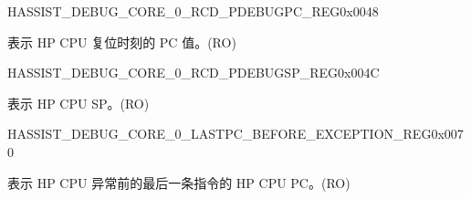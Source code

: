 \begin{register}{H}{ASSIST\_DEBUG\_CORE\_0\_RCD\_PDEBUGPC\_REG}{0x0048}\label{regdesc:ASSISTDEBUGCORE0RCDPDEBUGPCREG}
%
\regnewline%
\begin{regdesc}\begin{reglist}
\label{fielddesc:ASSISTDEBUGCORE0RCDPDEBUGPC}\item [ASSIST\_DEBUG\_CORE\_0\_RCD\_PDEBUGPC] 表示 HP CPU 复位时刻的 PC 值。(RO)
\end{reglist}\end{regdesc}
\end{register}


\begin{register}{H}{ASSIST\_DEBUG\_CORE\_0\_RCD\_PDEBUGSP\_REG}{0x004C}\label{regdesc:ASSISTDEBUGCORE0RCDPDEBUGSPREG}
%
\regnewline%
\begin{regdesc}\begin{reglist}
\label{fielddesc:ASSISTDEBUGCORE0RCDPDEBUGSP}\item [ASSIST\_DEBUG\_CORE\_0\_RCD\_PDEBUGSP] 表示 HP CPU SP。(RO)
\end{reglist}\end{regdesc}
\end{register}


\begin{register}{H}{ASSIST\_DEBUG\_CORE\_0\_LASTPC\_BEFORE\_EXCEPTION\_REG}{0x0070}\label{regdesc:ASSISTDEBUGCORE0LASTPCBEFOREEXCEPTIONREG}
%
\regnewline%
\begin{regdesc}\begin{reglist}
\label{fielddesc:ASSISTDEBUGCORE0LASTPCBEFOREEXC}\item [ASSIST\_DEBUG\_CORE\_0\_LASTPC\_BEFORE\_EXC] 表示 HP CPU 异常前的最后一条指令的 HP CPU PC。(RO)
\end{reglist}\end{regdesc}
\end{register}


